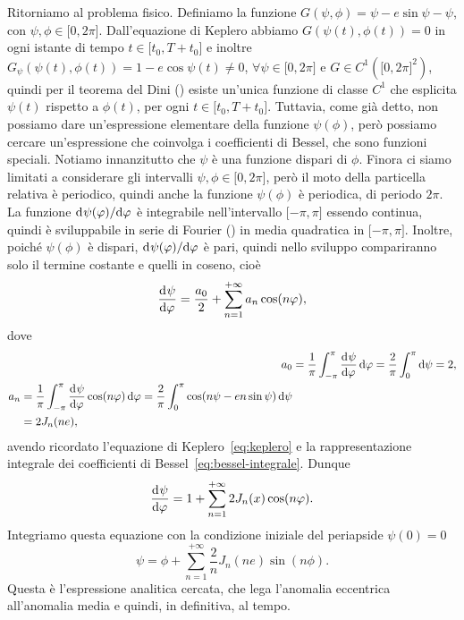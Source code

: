 Ritorniamo al problema fisico. Definiamo la funzione $G(\psi,\phi) = \psi -
e\sin\psi - \psi$, con $\psi,\phi\in\mathopen{[}0,
2\pi\mathclose{]}$. Dall'equazione di Keplero abbiamo $G(\psi(t),\phi(t)) = 0$
in ogni istante di tempo $t\in\mathopen{[}t_0,T+t_0\mathclose{]}$ e inoltre
$G_\psi(\psi(t),\phi(t)) = 1 - e\cos\psi(t) \neq 0$,
$\forall\psi\in\mathopen{[}0, 2\pi\mathclose{]}$ e $G\in C^1(\mathopen{[}0,
2\pi\mathclose{]}^2)$, quindi per il teorema del Dini
(\textcite[267]{demarco:analisi2}) esiste un'unica funzione di classe $C^1$ che
esplicita $\psi(t)$ rispetto a $\phi(t)$, per ogni
$t\in\mathopen{[}t_0,T+t_0\mathclose{]}$. Tuttavia, come già detto, non possiamo
dare un'espressione elementare della funzione $\psi(\phi)$, però possiamo
cercare un'espressione che coinvolga i coefficienti di Bessel, che sono funzioni
speciali. Notiamo innanzitutto che $\psi$ è una funzione dispari di
$\phi$. Finora ci siamo limitati a considerare gli intervalli
$\psi,\phi\in\mathopen{[}0, 2\pi\mathclose{]}$, però il moto della particella
relativa è periodico, quindi anche la funzione $\psi(\phi)$ è periodica, di
periodo $2\pi$.  La funzione $\mathrm{d}^{}\psi(\varphi) / \mathrm{d} {\varphi}^{}$ è integrabile
nell'intervallo $\mathopen{[}-\pi, \pi\mathclose{]}$ essendo continua, quindi è
sviluppabile in serie di Fourier (\textcite[440]{demarco:analisi2}) in media
quadratica in $\mathopen{[}-\pi, \pi\mathclose{]}$. Inoltre, poiché $\psi(\phi)$
è dispari, $\mathrm{d}^{}\psi(\varphi) / \mathrm{d} {\varphi}^{}$ è pari, quindi nello sviluppo
compariranno solo il termine costante e quelli in coseno, cioè
\begin{equation}
  \frac{{\mathop{}\!\mathrm{d}^{}}\psi}{\mathop{}\!\mathrm{d} {\varphi}^{}} = \frac{a_0}{2} + \sum_{n=1}^{+\infty}a_n\cos(n\varphi),
\end{equation}
dove
\begin{align}
  a_0 &= \frac{1}{\pi}\int_{-\pi}^{\pi}\toder{\psi}{\phi}\dd\phi =
  \frac{2}{\pi}\int_0^\pi\dd\psi = 2,\\
  \begin{split}
    a_n &= \frac{1}{\pi}\int_{-\pi}^\pi\toder{\psi}{\phi}\cos(n\phi)\dd\phi =
    \frac{2}{\pi}\int_0^\pi\cos(n\psi - en\sin\psi)\dd\psi \\
    &= 2J_n(ne),
  \end{split}
\end{align}
avendo ricordato l'equazione di Keplero~\eqref{eq:keplero} e la rappresentazione
integrale dei coefficienti di Bessel~\eqref{eq:bessel-integrale}. Dunque
\begin{equation}
  \frac{{\mathop{}\!\mathrm{d}^{}}\psi}{\mathop{}\!\mathrm{d} {\varphi}^{}} = 1 + \sum_{n=1}^{+\infty}2J_n(x)\cos(n\varphi).
\end{equation}
Integriamo questa equazione con la condizione iniziale del periapside $\psi(0) =
0$
\begin{equation}
  \psi = \phi + \sum_{n=1}^{+\infty}\frac{2}{n}J_n(ne)\sin(n\phi).
\end{equation}
Questa è l'espressione analitica cercata, che lega l'anomalia eccentrica
all'anomalia media e quindi, in definitiva, al tempo.

